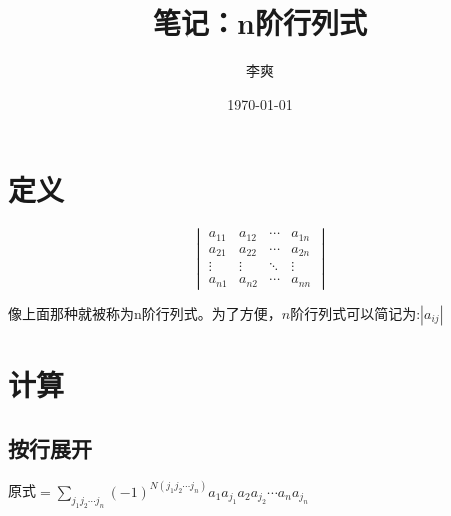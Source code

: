 \documentclass[UTF8, 12pt]{article} %
\title{笔记：n阶行列式}
\author{李爽}
\date{\today}
\begin{document}
\maketitle
\section{定义}
$$
\begin{vmatrix}
    a_{11} & a_{12} & \cdots & a_{1n} \\
    a_{21} & a_{22} & \cdots & a_{2n} \\
    \vdots & \vdots & \ddots & \vdots \\
    a_{n1} & a_{n2} & \cdots & a_{nn}
\end{vmatrix}
$$

像上面那种就被称为n阶行列式。为了方便，$n$阶行列式可以简记为:$|a_{ij}|$

\section{计算}
\subsection{按行展开}

原式$=\sum_{j_1 j_2 \cdots j_n} (-1)^{N(j_1 j_2 \cdots j_n)} a_1 a_{j_1} a_2 a_{j_2} \cdots a_n a_{j_n}$
\end{document}
